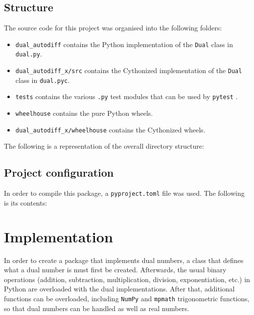 \documentclass[11pt,a4paper]{article}
\begin{document}
\subsection{Structure}
The source code for this project was organised into the following folders:

\begin{itemize}
    \item \texttt{dual\_autodiff} contains the Python implementation of the \texttt{Dual} class in \texttt{dual.py}.
    \item \texttt{dual\_autodiff\_x/src} contains the Cythonized implementation of the \texttt{Dual} class in \texttt{dual.pyc}.
    \item \texttt{tests} contains the various \texttt{.py} test modules that can be used by \texttt{pytest} \citep{pytestx.y}.
    \item \texttt{wheelhouse} contains the pure Python wheels.
    \item \texttt{dual\_autodiff\_x/wheelhouse} contains the Cythonized wheels.
\end{itemize}
\newpage
The following is a representation of the overall directory structure:


\subsection{Project configuration}
In order to compile this package, a \texttt{pyproject.toml} file was used. The following is its contents:

\newpage
\section{Implementation}
In order to create a package that implements dual numbers, a class that defines what a dual number is must first be created. Afterwards, the usual binary operations (addition, subtraction, multiplication, division, exponentiation, etc.) in Python are overloaded with the dual implementations. After that, additional functions can be overloaded, including \texttt{NumPy} and \texttt{mpmath} trigonometric functions, so that dual numbers can be handled as well as real numbers. 
\end{document}
